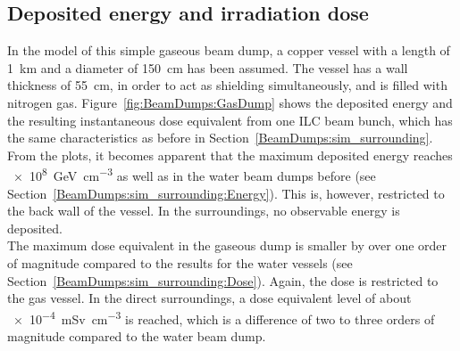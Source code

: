 \subsection{Deposited energy and irradiation dose}
In the \fluka model of this simple gaseous beam dump, a copper vessel with a length of \SI{1}{\kilo\meter} and a diameter of \SI{150}{\centi\meter} has been assumed.
The vessel has a wall thickness of \SI{55}{\centi\meter}, in order to act as shielding simultaneously, and is filled with nitrogen gas.
Figure~\ref{fig:BeamDumps:GasDump} shows the deposited energy and the resulting instantaneous dose equivalent from one ILC beam bunch, which has the same characteristics as before in Section~\ref{BeamDumps:sim_surrounding}.
From the plots, it becomes apparent that the maximum deposited energy reaches \SI{e8}{\GeV\per\centi\meter\cubed} as well as in the water beam dumps before (see Section~\ref{BeamDumps:sim_surrounding:Energy}).
This is, however, restricted to the back wall of the vessel.
In the surroundings, no observable energy is deposited.
\\The maximum dose equivalent in the gaseous dump is smaller by over one order of magnitude compared to the results for the water vessels (see Section~\ref{BeamDumps:sim_surrounding:Dose}).
Again, the dose is restricted to the gas vessel.
In the direct surroundings, a dose equivalent level of about \SI{e-4}{\milli\sievert\per\centi\meter\cubed} is reached, which is a difference of two to three orders of magnitude compared to the water beam dump.
